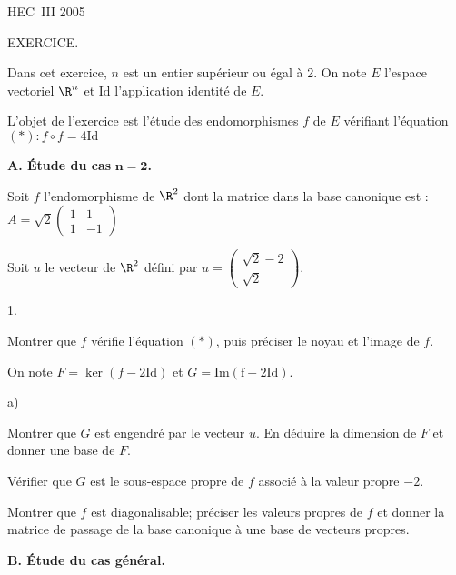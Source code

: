 \documentclass[11pt]{article}%
\begin{document}
\begin{center}
{\Huge HEC\ III 2005}
\end{center}

{\Large EXERCICE.}

Dans cet exercice, $n$ est un entier supérieur ou égal à 2. On
note $E$ l'espace vectoriel $\R^{n}$ et $\mathrm{Id}$ l'application
identité de $E$.

L'objet de l'exercice est l'étude des endomorphismes $f$ de $E$
vérifiant l'équation $\left( *\right) :f\circ f = 4\mathrm{Id}$

\textbf{A. Étude du cas }$\mathbf{n = 2}$\textbf{.}

Soit $f$ l'endomorphisme de $\R^{2}$ dont la matrice dans la base
canonique est : $A = \sqrt{2}\left( 
\begin{array}{cc}
1 & 1 \\
1 & -1
\end{array}
\right) $

Soit $u$ le vecteur de $\R^{2}$ défini par $u = \left( 
\begin{array}{c}
\sqrt{2}-2 \\
\sqrt{2}
\end{array}
\right) $.

\begin{noliste}{1.}
 \setlength{\itemsep}{4mm}
\item Montrer que $f$ vérifie l'équation $\left( *\right) $, puis
préciser le noyau et l'image de $f$.

\item On note $F = \ker \left( f-2\mathrm{Id}\right) $ et $G =
\mathrm{{Im}\left( f-2\mathrm{Id}\right).}$

\begin{noliste}{a)}
 \setlength{\itemsep}{2mm}
\item Montrer que $G$ est engendré par le vecteur $u$. En déduire la
dimension de $F$ et donner une base de $F$.

\item Vérifier que $G$ est le sous-espace propre de $f$ associé à
la valeur propre $-2$.
\end{noliste}

\item Montrer que $f$ est diagonalisable; préciser les valeurs propres
de $f$ et donner la matrice de passage de la base canonique à une base
de vecteurs propres.
\end{noliste}

\textbf{B. Étude du cas général.}
\end{document}
